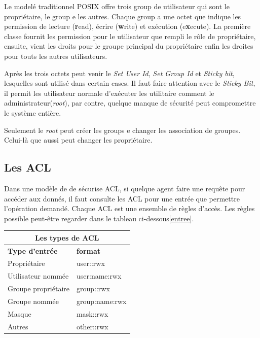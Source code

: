 Le modelé traditionnel POSIX offre trois group de utilisateur qui sont le propriétaire, le group e les autres. Chaque group a une octet que indique les permission de lecture (\textbf{r}ead), écrire (\textbf{w}rite) et exécution (e\textbf{x}ecute). La première classe fournit les permission pour le utilisateur que rempli le rôle de propriétaire, ensuite, vient les droits pour le groupe principal du propriétaire enfin les droites pour touts les autres utilisateurs. 
 
Après les trois octets peut venir le \emph{Set User Id}, \emph{Set Group Id} et \emph{Sticky bit}, lesquelles sont utilisé dans certain cases. Il faut faire attention avec le \emph{Sticky Bit}, il permit les utilisateur normale d'exécuter les utilitaire comment le administrateur(\emph{root}), par contre, quelque manque de sécurité peut compromettre le système entière.

Seulement le \emph{root} peut créer les groups e changer les association de groupes. Celui-là que aussi peut changer les propriétaire. 

\subsection*{Les ACL}

Dans une modèle de de sécurise ACL, si quelque agent faire une requête pour accéder aux donnés, il faut consulte les ACL pour une entrée que permettre l'opération demandé. Chaque ACL est une ensemble de règles d'accès. Les règles possible peut-être regarder dans le tableau ci-dessous\ref{entree}.
\begin{center}
\begin{tabular}{|l|l|}
  \hline
    \multicolumn{2}{|c|}{Les types de ACL} \\
  \hline
	\textbf{Type d'entrée} & \textbf{format} \\
  \hline
	Propriétaire & user::rwx \\
	Utilisateur nommée & user:name:rwx  \\
	Groupe propriétaire & group::rwx \\
	Groupe nommée & group:name:rwx \\
	Masque & mask::rwx \\
	Autres & other::rwx \\   
  \hline
\end{tabular}
\label{tab:entree}
\end{center}

